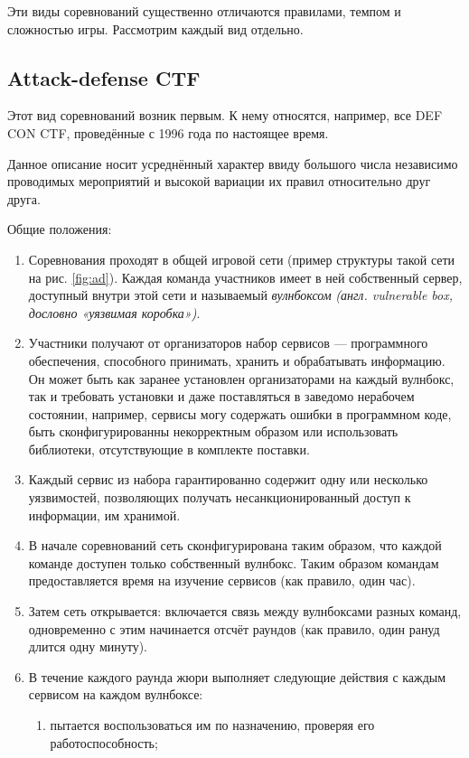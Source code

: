 Эти виды соревнований существенно отличаются правилами, темпом и сложностью игры. Рассмотрим каждый вид отдельно.


\subsection{Attack-defense CTF}

Этот вид соревнований возник первым. К нему относятся, например, все DEF CON CTF, проведённые с 1996 года по настоящее время.

Данное описание носит усреднённый характер ввиду большого числа независимо проводимых мероприятий и высокой вариации их правил относительно друг друга.

Общие положения:
\begin{enumerate}
  \item Соревнования проходят в общей игровой сети (пример структуры такой сети на рис. \ref{fig:ad}). Каждая команда участников имеет в ней собственный сервер, доступный внутри этой сети и называемый \textit{вулнбоксом} \textit{(англ. vulnerable box, дословно «уязвимая коробка»)}.
  \item Участники получают от организаторов набор сервисов — программного обеспечения, способного принимать, хранить и обрабатывать информацию. Он может быть как заранее установлен организаторами на каждый вулнбокс, так и требовать установки и даже поставляться в заведомо нерабочем состоянии, например, сервисы могу содержать ошибки в программном коде, быть сконфигурированны некорректным образом или использовать библиотеки, отсутствующие в комплекте поставки.
  \item Каждый сервис из набора гарантированно содержит одну или несколько уязвимостей, позволяющих получать несанкционированный доступ к информации, им хранимой.
  \item В начале соревнований сеть сконфигурирована таким образом, что каждой команде доступен только собственный вулнбокс. Таким образом командам предоставляется время на изучение сервисов (как правило, один час).
  \item Затем сеть открывается: включается связь между вулнбоксами разных команд, одновременно с этим начинается отсчёт раундов (как правило, один рануд длится одну минуту).
  \item В течение каждого раунда жюри выполняет следующие действия с каждым сервисом на каждом вулнбоксе:
    \begin{enumerate}
      \item пытается воспользоваться им по назначению, проверяя его работоспособность;

\end{enumerate}
\end{enumerate}

